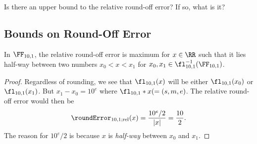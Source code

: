 \begin{puzzle}
Is there an upper bound to the relative round-off error? If so, what is it?
\end{puzzle}

\subsection{Bounds on Round-Off Error}


\begin{lemma}
In $\FF_{10,1}$, the relative round-off error is maximum for $x\in\RR$
such that it lies half-way between two numbers $x_{0}<x<x_{1}$ for
$x_{0},x_{1}\in\fl_{10,1}^{-1}(\FF_{10,1})$.
\end{lemma}
\begin{proof}
Regardless of rounding, we see that $\fl_{10,1}(x)$ will be either
$\fl_{10,1}(x_{0})$ or $\fl_{10,1}(x_{1})$. But $x_{1}-x_{0}=10^{e}$
where $\fl_{10,1}*x(=(s,m,e)$.
The relative round-off error would then be
\begin{equation}
  \roundError_{10,1;\text{rel}}(x) = \frac{10^{e}/2}{|x|} = \frac{10}{2}.
\end{equation}
The reason for $10^{e}/2$ is because $x$ is \emph{half-way} between
$x_{0}$ and $x_{1}$.
\end{proof}

